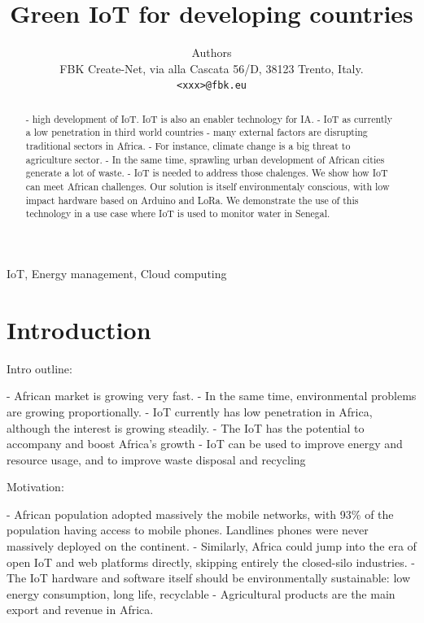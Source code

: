 \documentclass[10pt, conference, compsocconf]{IEEEtran}
\newcommand {\0} {\mathbf 0}
\newcommand {\1} {\mathbf 1}
\begin{document}
\title{Green IoT for developing countries}


\author{
Authors\\
FBK Create-Net, via alla Cascata 56/D, 38123 Trento, Italy.\\
\texttt{<xxx>@fbk.eu}
}

\maketitle

\begin{abstract}
- high development of IoT. IoT is also an enabler technology for IA.
- IoT as currently a low penetration in third world countries
- many external factors are disrupting traditional sectors in Africa.
- For instance, climate change is a big threat to agriculture sector.
- In the same time, sprawling urban development of African cities generate a lot of waste.
- IoT is needed to address those chalenges.
We show how IoT can meet African challenges.
Our solution is itself environmentaly conscious, with low impact hardware based on Arduino and LoRa.
We demonstrate the use of this technology in a use case where IoT is used to monitor water in Senegal.

\end{abstract}

\begin{IEEEkeywords}
IoT, Energy management, Cloud computing 
\end{IEEEkeywords}

\section{Introduction}
\label{intro}

\begin{markdown}
Intro outline:

- African market is growing very fast.
- In the same time, environmental problems are growing proportionally.
- IoT currently has low penetration in Africa, although the interest is growing steadily.
- The IoT has the potential to accompany and boost Africa's growth
- IoT can be used to improve energy and resource usage, and to improve waste disposal and recycling     

Motivation:

- African population adopted massively the mobile networks, with 93\% of the population having access to mobile phones. Landlines phones were never massively deployed on the continent.
- Similarly, Africa could jump into the era of open IoT and web platforms directly, skipping entirely the closed-silo industries. 
- The IoT hardware and software itself should be environmentally sustainable: low energy consumption, long life, recyclable
- Agricultural products are the main export and revenue in Africa.

\end{markdown}
\end{document}
